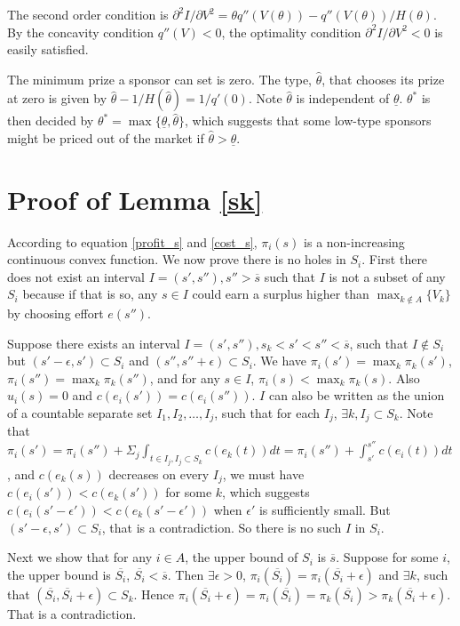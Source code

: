 \documentclass[12pt]{article}
\begin{document}
The second order condition is ${\partial^{2}I}/{\partial V^{2}}=\theta q''(V(\theta))-q''(V(\theta))/H(\theta)$.
By the concavity condition $q''(V)<0$, the optimality condition ${\partial^{2}I}/{\partial V^{2}}<0$
is easily satisfied.

The minimum prize a sponsor can set is zero. The type, $\hat{\theta}$,
that chooses its prize at zero is given by $\hat{\theta}-1/H(\hat{\theta})=1/q'(0)$.
Note $\hat{\theta}$ is independent of $\underline{\theta}$. $\theta^{*}$
is then decided by $\theta^{*}=\max\{\underline{\theta},\hat{\theta}\}$,
which suggests that some low-type sponsors might be priced out of
the market if $\hat{\theta}>\underline{\theta}$.


\section{Proof of Lemma \ref{sk}}

According to equation \ref{profit_s} and \ref{cost_s}, $\pi_{i}(s)$
is a non-increasing continuous convex function. We now prove there
is no holes in $S_{i}$. First there does not exist an interval $I=(s',s''),s''>\overline{s}$
such that $I$ is not a subset of any $S_{i}$ because if that is
so, any $s\in I$ could earn a surplus higher than $\max_{k\not\in A}\{V_{k}\}$
by choosing effort $e(s'')$.

Suppose there exists an interval $I=(s',s''),s_{k}<s'<s''<\overline{s}$,
such that $I\not\in S_{i}$ but $(s'-\epsilon,s')\subset S_{i}$ and
$(s'',s''+\epsilon)\subset S_{i}$. We have $\pi_{i}(s')=\max_{k}\pi_{k}(s')$,
$\pi_{i}(s'')=\max_{k}\pi_{k}(s'')$, and for any $s\in I$, $\pi_{i}(s)<\max_{k}\pi_{k}(s)$.
Also $u_{i}(s)=0$ and $c(e_{i}(s'))=c(e_{i}(s''))$. $I$ can also
be written as the union of a countable separate set $I_{1},I_{2},\dots,I_{j}$,
such that for each $I_{j}$, $\exists k,I_{j}\subset S_{k}$. Note
that $\pi_{i}(s')=\pi_{i}(s'')+\Sigma_{j}\int_{t\in I_{j},I_{j}\subset S_{k}}c(e_{k}(t))dt=\pi_{i}(s'')+\int_{s'}^{s''}c(e_{i}(t))dt$,
and $c(e_{k}(s))$ decreases on every $I_{j}$, we must have $c(e_{i}(s'))<c(e_{k}(s'))$
for some $k$, which suggests $c(e_{i}(s'-\epsilon'))<c(e_{k}(s'-\epsilon'))$
when $\epsilon'$ is sufficiently small. But $(s'-\epsilon,s')\subset S_{i}$,
that is a contradiction. So there is no such $I$ in $S_{i}$.

Next we show that for any $i\in A$, the upper bound of $S_{i}$ is
$\overline{s}$. Suppose for some $i$, the upper bound is $\overline{S_{i}}$,
$\overline{S_{i}}<\overline{s}$. Then $\exists\epsilon>0$, $\pi_{i}(\overline{S_{i}})=\pi_{i}(\overline{S_{i}}+\epsilon)$
and $\exists k$, such that $(\overline{S_{i}},\overline{S_{i}}+\epsilon)\subset S_{k}$.
Hence $\pi_{i}(\overline{S_{i}}+\epsilon)=\pi_{i}(\overline{S_{i}})=\pi_{k}(\overline{S_{i}})>\pi_{k}(\overline{S_{i}}+\epsilon)$.
That is a contradiction.
\end{document}
